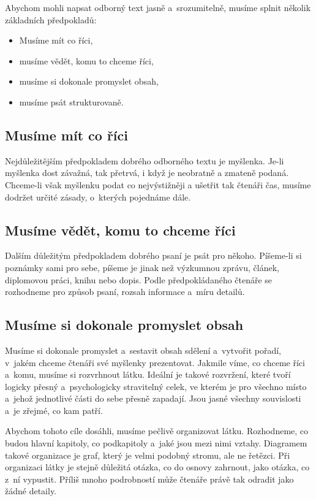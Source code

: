 Abychom mohli napsat odborný text jasně a~srozumitelně, musíme splnit několik základních předpokladů:
\begin{itemize}
\item Musíme mít co říci,
\item musíme vědět, komu to chceme říci,
\item musíme si dokonale promyslet obsah,
\item musíme psát strukturovaně. 
\end{itemize}

\subsection*{Musíme mít co říci}
Nejdůležitějším předpokladem dobrého odborného textu je myšlenka. Je-li myšlenka dost závažná, tak přetrvá, i když je neobratně a zmateně podaná. Chceme-li však myšlenku podat co nejvýstižněji a ušetřit tak čtenáři čas, musíme dodržet určité zásady, o~kterých pojednáme dále.

\subsection*{Musíme vědět, komu to chceme říci}
Dalším důležitým předpokladem dobrého psaní je psát pro někoho. Píšeme-li si poznámky sami pro sebe, píšeme je jinak než výzkumnou zprávu, článek, diplomovou práci, knihu nebo dopis. Podle předpokládaného čtenáře se rozhodneme pro způsob psaní, rozsah informace a~míru detailů.

\subsection*{Musíme si dokonale promyslet obsah}
Musíme si dokonale promyslet a~sestavit obsah sdělení a~vytvořit pořadí, v~jakém chceme čtenáři své myšlenky prezentovat. 
Jakmile víme, co chceme říci a~komu, musíme si rozvrhnout látku. Ideální je takové rozvržení, které tvoří logicky přesný a~psychologicky stravitelný celek, ve kterém je pro všechno místo a~jehož jednotlivé části do sebe přesně zapadají. Jsou jasné všechny souvislosti a~je zřejmé, co kam patří.

Abychom tohoto cíle dosáhli, musíme pečlivě organizovat látku. Rozhodneme, co budou hlavní kapitoly, co podkapitoly a~jaké jsou mezi nimi vztahy. Diagramem takové organizace je graf, který je velmi podobný stromu, ale ne řetězci. Při organizaci látky je stejně důležitá otázka, co do osnovy zahrnout, jako otázka, co z~ní vypustit. Příliš mnoho podrobností může čtenáře právě tak odradit jako žádné detaily.

